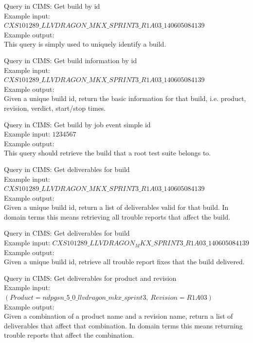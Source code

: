Query in CIMS: Get build by id \\
Example input: $CXS101289\_LLVDRAGON\_MKX\_SPRINT3\_R1A03\_140605084139$ \\
Example output: \\
This query is simply used to uniquely identify a build.

Query in CIMS: Get build information by id \\
Example input: $CXS101289\_LLVDRAGON\_MKX\_SPRINT3\_R1A03\_140605084139$ \\
Example output: \\
Given a unique build id, return the basic information for that build, i.e. product, revision, verdict, start/stop times.

Query in CIMS: Get build by job event simple id \\
Example input: $1234567$ \\
Example output: \\
This query should retrieve the build that a root test suite belongs to.

Query in CIMS: Get deliverables for build \\
Example input: $CXS101289\_LLVDRAGON\_MKX\_SPRINT3\_R1A03\_140605084139$ \\
Example output: \\
Given a unique build id, return a list of deliverables valid for that build. In domain terms this means retrieving all trouble reports that affect the build.

Query in CIMS: Get deliverables for build \\
Example input: $CXS101289\_LLVDRAGON_MKX\_SPRINT3\_R1A03\_140605084139$ \\
Example output: \\
Given a unique build id, retrieve all trouble report fixes that the build delivered.

Query in CIMS: Get deliverables for product and revision \\
Example input: $(Product=ndpgsn\_5\_0\_llvdragon\_mkx\_sprint3,\ Revision=R1A03)$ \\
Example output: \\
Given a combination of a product name and a revision name, return a list of deliverables that affect that combination. In domain terms this means returning trouble reports that affect the combination.


